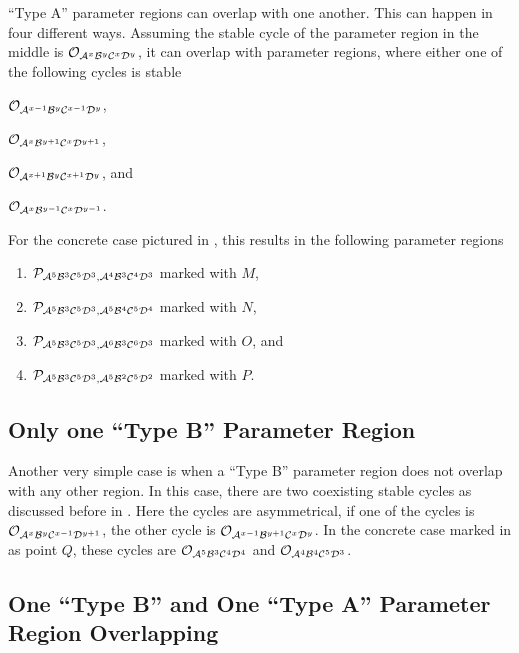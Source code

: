 ``Type A'' parameter regions can overlap with one another.
This can happen in four different ways.
Assuming the stable cycle of the parameter region in the middle is $\mathcal{O}_{\mathcal{A}^x\mathcal{B}^y\mathcal{C}^x\mathcal{D}^y}$, it can overlap with parameter regions, where either one of the following cycles is stable
\begin{enumerate*}
    \item $\mathcal{O}_{\mathcal{A}^{x-1}\mathcal{B}^y\mathcal{C}^{x-1}\mathcal{D}^y}$,
    \item $\mathcal{O}_{\mathcal{A}^x\mathcal{B}^{y+1}\mathcal{C}^x\mathcal{D}^{y+1}}$,
    \item $\mathcal{O}_{\mathcal{A}^{x+1}\mathcal{B}^y\mathcal{C}^{x+1}\mathcal{D}^y}$, and
    \item $\mathcal{O}_{\mathcal{A}^x\mathcal{B}^{y-1}\mathcal{C}^x\mathcal{D}^{y-1}}$.
\end{enumerate*}
For the concrete case pictured in , this results in the following parameter regions
\begin{enumerate}
    \item $\mathcal{P}_{\mathcal{A}^5\mathcal{B}^3\mathcal{C}^5\mathcal{D}^3, \mathcal{A}^4\mathcal{B}^3\mathcal{C}^4\mathcal{D}^3}$ marked with $M$,
    \item $\mathcal{P}_{\mathcal{A}^5\mathcal{B}^3\mathcal{C}^5\mathcal{D}^3, \mathcal{A}^5\mathcal{B}^4\mathcal{C}^5\mathcal{D}^4}$ marked with $N$,
    \item $\mathcal{P}_{\mathcal{A}^5\mathcal{B}^3\mathcal{C}^5\mathcal{D}^3, \mathcal{A}^6\mathcal{B}^3\mathcal{C}^6\mathcal{D}^3}$ marked with $O$, and
    \item $\mathcal{P}_{\mathcal{A}^5\mathcal{B}^3\mathcal{C}^5\mathcal{D}^3, \mathcal{A}^5\mathcal{B}^2\mathcal{C}^5\mathcal{D}^2}$ marked with $P$.
\end{enumerate}

\subsection{Only one ``Type B'' Parameter Region}

Another very simple case is when a ``Type B'' parameter region does not overlap with any other region.
In this case, there are two coexisting stable cycles as discussed before in .
Here the cycles are asymmetrical, if one of the cycles is $\mathcal{O}_{\mathcal{A}^x\mathcal{B}^y\mathcal{C}^{x-1}\mathcal{D}^{y+1}}$, the other cycle is $\mathcal{O}_{\mathcal{A}^{x-1}\mathcal{B}^{y+1}\mathcal{C}^x\mathcal{D}^y}$.
In the concrete case marked in  as point $Q$, these cycles are $\mathcal{O}_{\mathcal{A}^5\mathcal{B}^3\mathcal{C}^4\mathcal{D}^4}$ and $\mathcal{O}_{\mathcal{A}^4\mathcal{B}^4\mathcal{C}^5\mathcal{D}^3}$.

\subsection{One ``Type B'' and One ``Type A'' Parameter Region Overlapping}
\label{sec:minrep.coex.BA}

